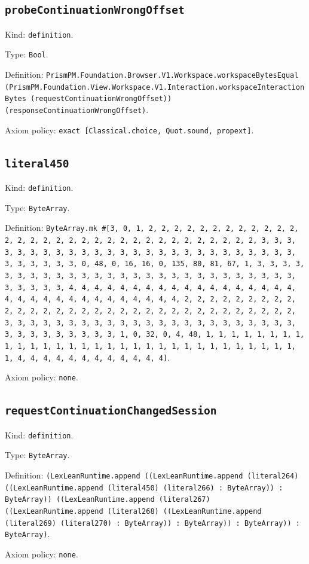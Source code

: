 \documentclass[11pt]{article}
\begin{document}
\subsection*{\texttt{probeContinuationWrongOffset}}
\noindent Kind: \texttt{definition}.\par
\noindent Type: \texttt{Bool}.\par
\noindent Definition: \texttt{PrismPM.Foundation.Browser.V1.Workspace.workspaceBytesEqual (PrismPM.Foundation.View.Workspace.V1.Interaction.workspaceInteractionBytes (requestContinuationWrongOffset)) (responseContinuationWrongOffset)}.\par
\noindent Axiom policy: \texttt{exact [Classical.choice, Quot.sound, propext]}.\par
\subsection*{\texttt{literal450}}
\noindent Kind: \texttt{definition}.\par
\noindent Type: \texttt{ByteArray}.\par
\noindent Definition: \texttt{ByteArray.mk \#[3, 0, 1, 2, 2, 2, 2, 2, 2, 2, 2, 2, 2, 2, 2, 2, 2, 2, 2, 2, 2, 2, 2, 2, 2, 2, 2, 2, 2, 2, 2, 2, 2, 2, 2, 3, 3, 3, 3, 3, 3, 3, 3, 3, 3, 3, 3, 3, 3, 3, 3, 3, 3, 3, 3, 3, 3, 3, 3, 3, 3, 3, 3, 3, 3, 3, 3, 0, 48, 0, 16, 16, 0, 135, 80, 81, 67, 1, 3, 3, 3, 3, 3, 3, 3, 3, 3, 3, 3, 3, 3, 3, 3, 3, 3, 3, 3, 3, 3, 3, 3, 3, 3, 3, 3, 3, 3, 3, 3, 3, 4, 4, 4, 4, 4, 4, 4, 4, 4, 4, 4, 4, 4, 4, 4, 4, 4, 4, 4, 4, 4, 4, 4, 4, 4, 4, 4, 4, 4, 4, 4, 4, 2, 2, 2, 2, 2, 2, 2, 2, 2, 2, 2, 2, 2, 2, 2, 2, 2, 2, 2, 2, 2, 2, 2, 2, 2, 2, 2, 2, 2, 2, 2, 2, 3, 3, 3, 3, 3, 3, 3, 3, 3, 3, 3, 3, 3, 3, 3, 3, 3, 3, 3, 3, 3, 3, 3, 3, 3, 3, 3, 3, 3, 3, 3, 3, 1, 0, 32, 0, 4, 48, 1, 1, 1, 1, 1, 1, 1, 1, 1, 1, 1, 1, 1, 1, 1, 1, 1, 1, 1, 1, 1, 1, 1, 1, 1, 1, 1, 1, 1, 1, 1, 1, 4, 4, 4, 4, 4, 4, 4, 4, 4, 4, 4, 4]}.\par
\noindent Axiom policy: \texttt{none}.\par
\subsection*{\texttt{requestContinuationChangedSession}}
\noindent Kind: \texttt{definition}.\par
\noindent Type: \texttt{ByteArray}.\par
\noindent Definition: \texttt{(LexLeanRuntime.append ((LexLeanRuntime.append (literal264) ((LexLeanRuntime.append (literal450) (literal266) : ByteArray)) : ByteArray)) ((LexLeanRuntime.append (literal267) ((LexLeanRuntime.append (literal268) ((LexLeanRuntime.append (literal269) (literal270) : ByteArray)) : ByteArray)) : ByteArray)) : ByteArray)}.\par
\noindent Axiom policy: \texttt{none}.\par
\end{document}
